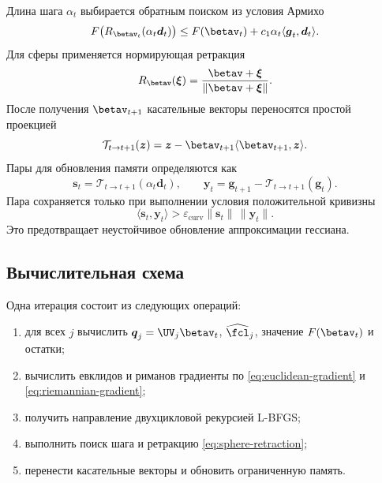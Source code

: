 Длина шага $\alpha_t$ выбирается обратным поиском из условия Армихо
\begin{equation}
 F\bigl(R_{\betav_t}(\alpha_t\boldsymbol{d}_t)\bigr)
 \le
 F(\betav_t)
 +c_1\alpha_t\langle\boldsymbol{g}_t,\boldsymbol{d}_t\rangle.
\label{eq:armijo}
\end{equation}
Для сферы применяется нормирующая ретракция
\begin{equation}
 R_{\betav}(\boldsymbol{\xi})
 =\frac{\betav+\boldsymbol{\xi}}{\|\betav+\boldsymbol{\xi}\|}.
\label{eq:sphere-retraction}
\end{equation}
После получения $\betav_{t+1}$ касательные векторы переносятся простой
проекцией
\begin{equation}
 \mathcal T_{t\to t+1}(\boldsymbol{z})
 =\boldsymbol{z}-\betav_{t+1}
   \langle\betav_{t+1},\boldsymbol{z}\rangle.
\label{eq:vector-transport}
\end{equation}
Пары для обновления памяти определяются как
\begin{equation}
 \boldsymbol{s}_t=\mathcal T_{t\to t+1}(\alpha_t\boldsymbol{d}_t),
 \qquad
 \boldsymbol{y}_t=\boldsymbol{g}_{t+1}-\mathcal T_{t\to t+1}(\boldsymbol{g}_t).
\label{eq:curvature-pairs}
\end{equation}
Пара сохраняется только при выполнении условия положительной кривизны
\begin{equation}
 \langle\boldsymbol{s}_t,\boldsymbol{y}_t\rangle
 >\varepsilon_{\mathrm{curv}}\|\boldsymbol{s}_t\|\,\|\boldsymbol{y}_t\|.
\label{eq:curvature-test}
\end{equation}
Это предотвращает неустойчивое обновление аппроксимации гессиана.

\subsection{Вычислительная схема}

Одна итерация состоит из следующих операций:
\begin{enumerate}
 \item для всех $j$ вычислить $\boldsymbol{q}_j=\UV_j\betav_t$,
       $\widehat{\fcl}_j$, значение $F(\betav_t)$ и остатки;
 \item вычислить евклидов и риманов градиенты по
       \eqref{eq:euclidean-gradient} и \eqref{eq:riemannian-gradient};
 \item получить направление двухцикловой рекурсией L-BFGS;
 \item выполнить поиск шага и ретракцию \eqref{eq:sphere-retraction};
 \item перенести касательные векторы и обновить ограниченную память.
\end{enumerate}

